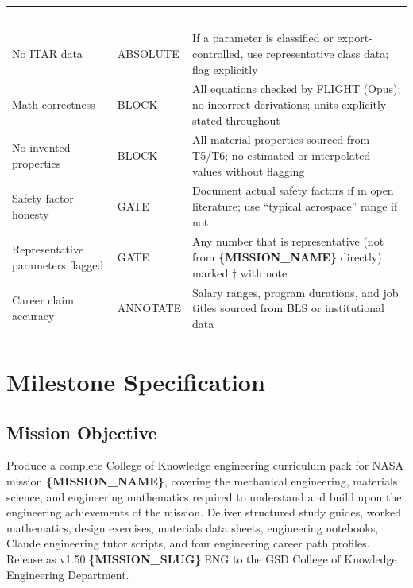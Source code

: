 \documentclass[11pt,letterpaper]{article}
\newcommand{\stageheader}[2]{%
  \noindent\colorbox{#2}{\makebox[\textwidth][l]{%
    \textcolor{white}{\bfseries\sffamily\hspace{6pt}#1\hspace{6pt}}}}%
  \vspace{0.5em}\par%
}
\newcommand{\param}[1]{\textcolor{paramred}{\textbf{\{#1\}}}}
\newcommand{\tableheader}[1]{\textbf{\sffamily\textcolor{white}{#1}}}
\begin{document}
\begin{center}
\begin{tabularx}{\textwidth}{L{3cm}L{2cm}X}
\toprule
{}
\tableheader{Rule} & \tableheader{Type} & \tableheader{Application} \\
\midrule
No ITAR data & ABSOLUTE & If a parameter is classified or export-controlled, use representative class data; flag explicitly \\
Math correctness & BLOCK & All equations checked by FLIGHT (Opus); no incorrect derivations; units explicitly stated throughout \\
No invented properties & BLOCK & All material properties sourced from T5/T6; no estimated or interpolated values without flagging \\
Safety factor honesty & GATE & Document actual safety factors if in open literature; use ``typical aerospace'' range if not \\
Representative parameters flagged & GATE & Any number that is representative (not from \param{MISSION\_NAME} directly) marked $\dagger$ with note \\
Career claim accuracy & ANNOTATE & Salary ranges, program durations, and job titles sourced from BLS or institutional data \\
\bottomrule
\end{tabularx}
\end{center}

\newpage

\stageheader{STAGE 3 --- MISSION PACKAGE}{tertiary}

\section{Milestone Specification}

\subsection{Mission Objective}

Produce a complete College of Knowledge engineering curriculum pack for NASA mission \param{MISSION\_NAME}, covering the mechanical engineering, materials science, and engineering mathematics required to understand and build upon the engineering achievements of the mission. Deliver structured study guides, worked mathematics, design exercises, materials data sheets, engineering notebooks, Claude engineering tutor scripts, and four engineering career path profiles. Release as v1.50.\param{MISSION\_SLUG}.ENG to the GSD College of Knowledge Engineering Department.
\end{document}
